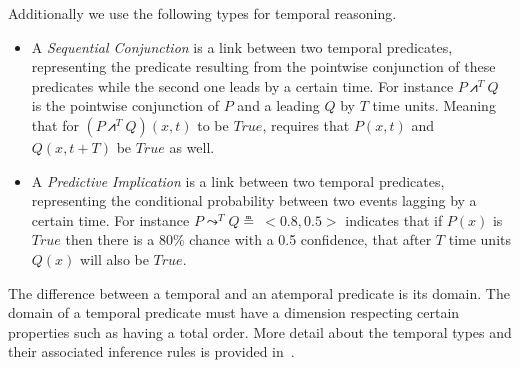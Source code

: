\documentclass[runningheads]{llncs}
\newcommand{\TTrue}{\textit{True}}
\newcommand{\lpreimp}[1]{\leadsto^{#1}}
\newcommand{\lseqand}[1]{\!\bigslopedwedge^{#1}\!}
\begin{document}
Additionally we use the following types for temporal reasoning.
\begin{itemize}
\item A \emph{Sequential Conjunction} is a link between two temporal
  predicates, representing the predicate resulting from the pointwise
  conjunction of these predicates while the second one leads by a
  certain time.  For instance $P \lseqand{T} Q$ is the pointwise
  conjunction of $P$ and a leading $Q$ by $T$ time units.  Meaning
  that for $(P \lseqand{T} Q)(x, t)$ to be $\TTrue$, requires that
  $P(x, t)$ and $Q(x, t+T)$ be $\TTrue$ as well.
\item A \emph{Predictive Implication} is a link between two temporal
  predicates, representing the conditional probability between two
  events lagging by a certain time.  For instance
  $P \lpreimp{T} Q \measeq\ <\!0.8, 0.5\!>$ indicates that if $P(x)$
  is $\TTrue$ then there is a 80\% chance with a 0.5
  confidence, that after $T$ time units $Q(x)$ will also be
  $\TTrue$.
\end{itemize}
The difference between a temporal and an atemporal predicate is its
domain.  The domain of a temporal predicate must have a dimension
respecting certain properties such as having a total order.  More
detail about the temporal types and their associated inference rules
is provided in~\cite{Geisweiller2023TPLN}.

\end{document}
